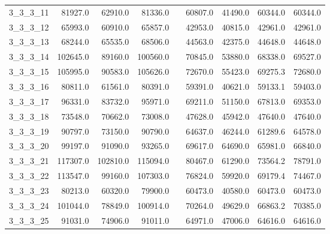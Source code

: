 \begin{longtable}{lrrrcrrrr}
3\_3\_3\_11      &     81927.0 &       62910.0 &        81336.0 &&       60807.0 &         41490.0 &          60344.0 &          60344.0 \\
3\_3\_3\_12      &     65993.0 &       60910.0 &        65857.0 &&       42953.0 &         40815.0 &          42961.0 &          42961.0 \\
3\_3\_3\_13      &     68244.0 &       65535.0 &        68506.0 &&       44563.0 &         42375.0 &          44648.0 &          44648.0 \\
3\_3\_3\_14      &    102645.0 &       89160.0 &       100560.0 &&       70845.0 &         53880.0 &          68338.0 &          69527.0 \\
3\_3\_3\_15      &    105995.0 &       90583.0 &       105626.0 &&       72670.0 &         55423.0 &          69275.3 &          72680.0 \\
3\_3\_3\_16      &     80811.0 &       61561.0 &        80391.0 &&       59391.0 &         40621.0 &          59133.1 &          59403.0 \\
3\_3\_3\_17      &     96331.0 &       83732.0 &        95971.0 &&       69211.0 &         51150.0 &          67813.0 &          69353.0 \\
3\_3\_3\_18      &     73548.0 &       70662.0 &        73008.0 &&       47628.0 &         45942.0 &          47640.0 &          47640.0 \\
3\_3\_3\_19      &     90797.0 &       73150.0 &        90790.0 &&       64637.0 &         46244.0 &          61289.6 &          64578.0 \\
3\_3\_3\_20      &     99197.0 &       91090.0 &        93265.0 &&       69617.0 &         64690.0 &          65981.0 &          66840.0 \\
3\_3\_3\_21      &    117307.0 &      102810.0 &       115094.0 &&       80467.0 &         61290.0 &          73564.2 &          78791.0 \\
3\_3\_3\_22      &    113547.0 &       99160.0 &       107303.0 &&       76824.0 &         59920.0 &          69179.4 &          74467.0 \\
3\_3\_3\_23      &     80213.0 &       60320.0 &        79900.0 &&       60473.0 &         40580.0 &          60473.0 &          60473.0 \\
3\_3\_3\_24      &    101044.0 &       78849.0 &       100914.0 &&       70264.0 &         49629.0 &          66863.2 &          70385.0 \\
3\_3\_3\_25      &     91031.0 &       74906.0 &        91011.0 &&       64971.0 &         47006.0 &          64616.0 &          64616.0 \\

\end{longtable}

